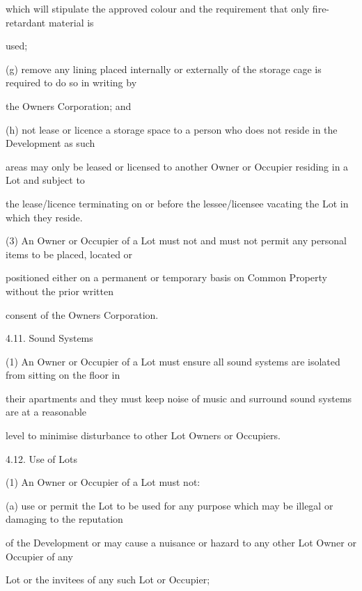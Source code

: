 \documentclass{article}
\begin{document}
{\fontsize{10.02}{1}which will stipulate the approved colour and the requirement that only fire-retardant material is }

{\fontsize{10.02}{1}used; }

{\fontsize{9.962}{1}(g) remove any lining placed internally or externally of the storage cage is required to do so in writing by }

{\fontsize{10.02}{1}the Owners Corporation; and }

{\fontsize{9.962}{1}(h) not lease or licence a storage space to a person who does not reside in the Development as such }

{\fontsize{10.02}{1}areas may only be leased or licensed to another Owner or Occupier residing in a Lot and subject to }

\newpage

{\fontsize{10.02}{1}the lease/licence terminating on or before the lessee/licensee vacating the Lot in which they reside. }

{\fontsize{9.962}{1}(3) An Owner or Occupier of a Lot must not and must not permit any personal items to be placed, located or }

{\fontsize{10.02}{1}positioned either on a permanent or temporary basis on Common Property without the prior written }

{\fontsize{10.02}{1}consent of the Owners Corporation. }

{\fontsize{9.99}{1}4.11. Sound Systems }

{\fontsize{9.962}{1}(1) An Owner or Occupier of a Lot must ensure all sound systems are isolated from sitting on the floor in }

{\fontsize{10.02}{1}their apartments and they must keep noise of music and surround sound systems are at a reasonable }

{\fontsize{10.02}{1}level to minimise disturbance to other Lot Owners or Occupiers. }

{\fontsize{9.99}{1}4.12. Use of Lots }

{\fontsize{9.962}{1}(1) An Owner or Occupier of a Lot must not: }

{\fontsize{9.962}{1}(a) use or permit the Lot to be used for any purpose which may be illegal or damaging to the reputation }

{\fontsize{10.02}{1}of the Development or may cause a nuisance or hazard to any other Lot Owner or Occupier of any }

{\fontsize{10.02}{1}Lot or the invitees of any such Lot or Occupier; }
\end{document}
